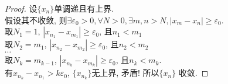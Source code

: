 \documentclass{article}
\begin{document}
\begin{proof}
    设$\{x_n\}$单调递且有上界. \\
    假设其不收敛, 则$\exists \varepsilon_0 > 0, \forall N > 0, \exists m, n > N, \left\lvert x_m - x_n\right\rvert \geqslant \varepsilon_0$. \\
    取$N_1 = 1$, $\left\lvert x_{n_1} - x_{m_1}\right\rvert \geqslant \varepsilon_0$, 且$n_1 < m_1$\\
    取$N_2 = m_1$, $\left\lvert x_{n_2} - x_{m_2}\right\rvert \geqslant \varepsilon_0$, 且$n_2 < m_2$ \\
    $\cdots$ \\
    取$N_k = m_{k - 1}$, $\left\lvert x_{n_k} - x_{m_k}\right\rvert \geqslant \varepsilon_0$, 且$n_k < m_k$. \\
    有$x_{n_k} - x_{n_1} > k\varepsilon_0$, $\{x_{n_k}\}$无上界, 矛盾!
    所以$\{x_n\}$ 收敛.
\end{proof}
\end{document}
